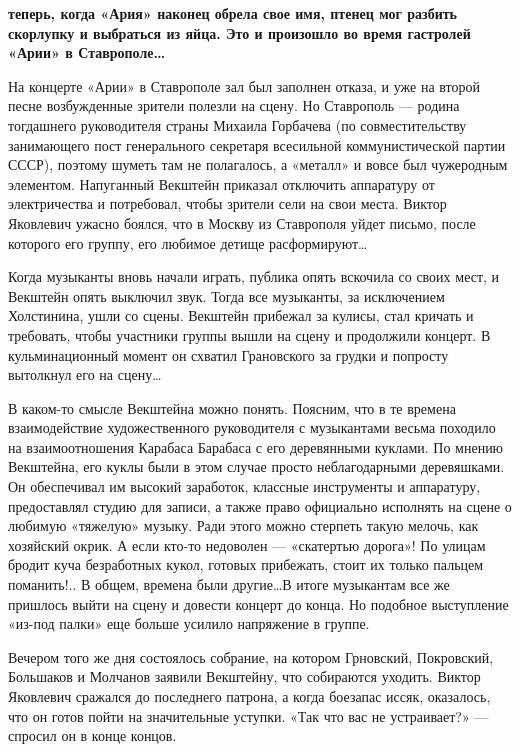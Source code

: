 \documentclass[16pt,a5paper]{book}
\begin{document}
\textbf{ теперь, когда «Ария» наконец обрела свое имя, птенец мог разбить скорлупку и выбраться из яйца. Это
и произошло во время гастролей «Арии» в Ставрополе\ldots}

На концерте «Арии» в Ставрополе зал был заполнен отказа, и уже на второй песне возбужденные зрители полезли на сцену. Но
Ставрополь — родина тогдашнего руководителя страны Михаила Горбачева (по совместительству занимающего пост генерального
секретаря всесильной коммунистической партии СССР), поэтому шуметь там не полагалось, а «металл» и вовсе был чужеродным
элементом. Напуганный Векштейн приказал отключить аппаратуру от электричества и потребовал, чтобы зрители сели на свои
места. Виктор Яковлевич ужасно боялся, что в Москву из Ставрополя уйдет письмо, после которого его группу, его любимое
детище расформируют\ldots

Когда музыканты вновь начали играть, публика опять вскочила со своих мест, и Векштейн опять выключил звук. Тогда все
музыканты, за исключением Холстинина, ушли со сцены. Векштейн прибежал за кулисы, стал кричать и требовать, чтобы
участники группы вышли на сцену и продолжили концерт. В кульминационный момент он схватил Грановского за грудки и
попросту вытолкнул его на сцену\ldots

В каком-то смысле Векштейна можно понять. Поясним, что в те времена взаимодействие художественного руководителя с
музыкантами весьма походило на взаимоотношения Карабаса Барабаса с его деревянными куклами. По мнению Векштейна, его
куклы были в этом случае просто неблагодарными деревяшками. Он обеспечивал им высокий заработок, классные инструменты и
аппаратуру, предоставлял студию для записи, а также право официально исполнять на сцене о любимую «тяжелую» музыку. Ради
этого можно стерпеть такую мелочь, как хозяйский окрик. А если кто-то недоволен — «скатертью дорога»! По улицам бродит
куча безработных кукол, готовых прибежать, стоит их только пальцем поманить!.. В общем, времена были другие\ldots В
итоге музыкантам все же пришлось выйти на сцену и довести концерт до конца. Но подобное выступление «из-под палки» еще
больше усилило напряжение в группе.

Вечером того же дня состоялось собрание, на котором Грновский, Покровский, Большаков и Молчанов заявили Векштейну, что
собираются уходить. Виктор Яковлевич сражался до последнего патрона, а когда боезапас иссяк, оказалось, что он готов
пойти на значительные уступки. «Так что вас не устраивает?» — спросил он в конце концов.
\end{document}
